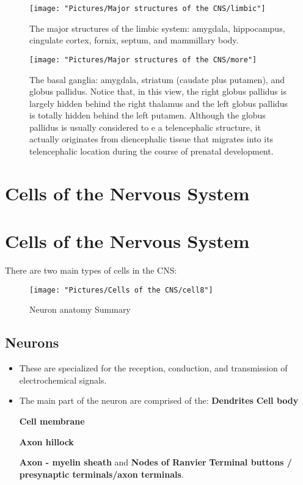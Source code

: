 \documentclass[12pt,a4paper]{article}
\begin{document}
\begin{figure}
	\centering
	\texttt{[image: "Pictures/Major structures of the CNS/limbic"]}
	\caption{The major structures of the limbic system: amygdala, hippocampus, cingulate cortex, fornix, septum, and mammillary body.}
	\label{fig:limbic}
\end{figure}


	
\begin{figure}
	\centering
	\texttt{[image: "Pictures/Major structures of the CNS/more"]}
	\caption{The basal ganglia: amygdala, striatum (caudate plus putamen), and globus pallidus. Notice that, in this view, the right globus pallidus is largely hidden behind the right thalamus and the left globus pallidus is totally hidden behind the left putamen. Although the globus pallidus is usually considered to e a telencephalic structure, it actually originates from diencephalic tissue that migrates into its telencephalic location during the course of prenatal development.}
	\label{fig:more}
\end{figure}
	
	\section*{Cells of the Nervous System}

	\section{Cells of the Nervous System}
	
	There are two main types of cells in the CNS:
	
	
\begin{figure}
	\centering
	\texttt{[image: "Pictures/Cells of the CNS/cell8"]}
	\caption{Neuron anatomy Summary}
	\label{fig:cell8}
\end{figure}
	
	\subsection{Neurons}
		\begin{itemize}
			\item These are specialized for the reception, conduction, and transmission of electrochemical signals. 
		\item The main part of the neuron are comprised of the:
		\subitem \textbf{Dendrites }
		\subitem \textbf{Cell body}
		
		\subitem \textbf{Cell membrane}
		
		\subitem \textbf{Axon hillock}
		
		\subitem \textbf{Axon - myelin sheath} and \textbf{Nodes of Ranvier}
		\subitem \textbf{Terminal buttons / presynaptic terminals/axon terminals}. 
		\end{itemize}
	
\end{document}
